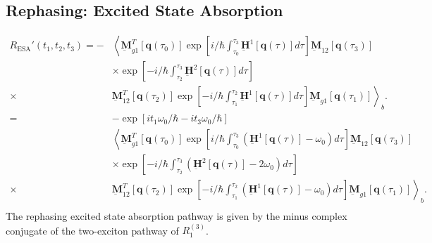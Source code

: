 \documentclass{article}
\newcommand{\bra}[1]{\ensuremath{\left\langle#1\right|}}
\newcommand{\ket}[1]{\ensuremath{\left|#1\right\rangle}}
\newcommand{\vect}[1]{\ensuremath{\boldsymbol{\mathbf{#1}}}}
\newcommand{\arw}{-{Latex[length=2mm]}}
\begin{document}
\subsection{Rephasing: Excited State Absorption}
\begin{figure}[h]
\centering
{}
\end{figure}
\begin{equation}
\begin{split}
 R_\mathrm{ESA}'(t_{1},t_{2},t_{3})=-
 &\left\langle\underbar{\vect{M}}_{g1}^{T}[\vect q(\tau_{0})]\exp\left[i/\hbar\int_{\tau_{0}}^{\tau_{3}}\underbar{\vect{H}}^{1}[\vect q(\tau)]d\tau\right] \underbar{\vect{M}}_{12} [\vect q(\tau_{3})]\right.\\
 &\times\exp\left[-i/\hbar\int_{\tau_{2}}^{\tau_{3}}\underbar{\vect{H}}^{2}[\vect q(\tau)]d\tau\right]\\
 \times&\left.\underbar{\vect{M}}_{12}^{T}[\vect q(\tau_{2})]\exp\left[-i/\hbar\int_{\tau_{1}}^{\tau_{2}}\underbar{\vect{H}}^{1}[\vect q(\tau)]d\tau\right] \underbar{\vect{M}}_{g1} [\vect q(\tau_{1})]\right\rangle_{b}.\\
 =&-\exp\left[i t_{1}\omega_{0}/\hbar-it_{3}\omega_{0}/\hbar\right]\\
 &\left\langle\underbar{\vect{M}}_{g1}^{T}[\vect q(\tau_{0})]\exp\left[i/\hbar\int_{\tau_{0}}^{\tau_{3}}\left(\underbar{\vect{H}}^{1}[\vect q(\tau)]-\omega_{0}\right)d\tau\right] \underbar{\vect{M}}_{12} [\vect q(\tau_{3})]\right.\\
 &\times\exp\left[-i/\hbar\int_{\tau_{2}}^{\tau_{3}}\left(\underbar{\vect{H}}^{2}[\vect q(\tau)]-2\omega_{0}\right)d\tau\right]\\
 \times&\left.\underbar{\vect{M}}_{12}^{T}[\vect q(\tau_{2})]\exp\left[-i/\hbar\int_{\tau_{1}}^{\tau_{2}}\left(\underbar{\vect{H}}^{1}[\vect q(\tau)]-\omega_{0}\right)d\tau\right] \underbar{\vect{M}}_{g1} [\vect q(\tau_{1})]\right\rangle_{b}.\\
\end{split}
\end{equation}
The rephasing excited state absorption pathway is given by the minus complex conjugate of the two-exciton pathway of $R_{1}^{(3)}$.\cite{Hamm2011}
\end{document}
